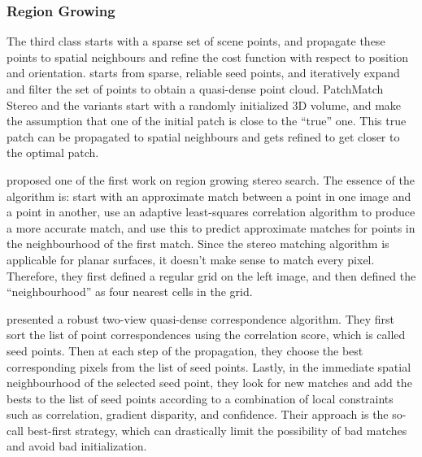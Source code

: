 
\subsubsection{Region Growing}
The third class starts with a sparse set of scene points, and propagate these points to spatial neighbours and refine the cost function with respect to position and orientation. \citeauthor{furukawa2010accurate} starts from sparse, reliable seed points, and iteratively expand and filter the set of points to obtain a quasi-dense point cloud. PatchMatch Stereo and the variants start with a randomly initialized 3D volume, and make the assumption that one of the initial patch is close to the ``true'' one. This true patch can be propagated to spatial neighbours and gets refined to get closer to the optimal patch.

\citeauthor{otto1989region} proposed one of the first work on region growing stereo search. The essence of the algorithm is: start with an approximate match between a point in one image and a point in another, use an adaptive least-squares correlation algorithm to produce a more accurate match, and use this to predict approximate matches for points in the neighbourhood of the first match. Since the stereo matching algorithm is applicable for planar surfaces, it doesn't make sense to match every pixel. Therefore, they first defined a regular grid on the left image, and then defined the ``neighbourhood'' as four nearest cells in the grid.

\citeauthor{lhuillier2005quasi} presented a robust two-view quasi-dense correspondence algorithm. They first sort the list of point correspondences using the correlation score, which is called seed points. Then at each step of the propagation, they choose the best corresponding pixels from the list of seed points. Lastly, in the immediate spatial neighbourhood of the selected seed point, they look for new matches and add the bests to the list of seed points according to a combination of local constraints such as correlation, gradient disparity, and confidence. Their approach is the so-call best-first strategy, which can drastically limit the possibility of bad matches and avoid bad initialization.

